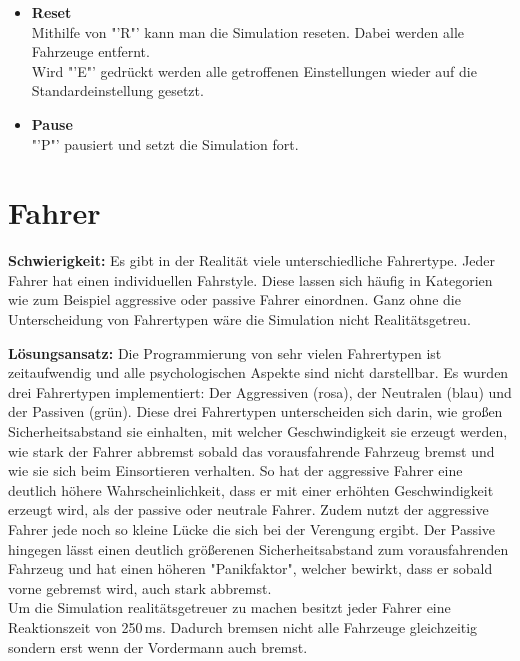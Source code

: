 \begin{addmargin}[25pt]{0pt}
\begin{itemize}
		\item \textbf{Reset}\\
		Mithilfe von "'R"' kann man die Simulation reseten. Dabei werden alle Fahrzeuge entfernt.\\
		Wird "'E"' gedrückt werden alle getroffenen Einstellungen wieder auf die Standardeinstellung gesetzt.
		\item \textbf{Pause}\\
		"'P"' pausiert und setzt die Simulation fort.
	\end{itemize}
\end{addmargin}

\section{Fahrer}
\textbf{Schwierigkeit:} Es gibt in der Realität viele unterschiedliche Fahrertype. Jeder Fahrer hat einen individuellen Fahrstyle. Diese lassen sich häufig in Kategorien wie zum Beispiel aggressive oder passive Fahrer einordnen. Ganz ohne die Unterscheidung von Fahrertypen wäre die Simulation nicht Realitätsgetreu.
\begin{addmargin}[25pt]{0pt}
	\item \textbf{Lösungsansatz:} Die Programmierung von sehr vielen Fahrertypen ist zeitaufwendig und alle psychologischen Aspekte sind nicht darstellbar. Es wurden drei Fahrertypen implementiert: Der Aggressiven (rosa), der Neutralen (blau) und der Passiven (grün). Diese drei Fahrertypen unterscheiden sich darin, wie großen Sicherheitsabstand sie einhalten, mit welcher Geschwindigkeit sie erzeugt werden, wie stark der Fahrer abbremst sobald das vorausfahrende Fahrzeug bremst und wie sie sich beim Einsortieren verhalten. So hat der aggressive Fahrer eine deutlich höhere Wahrscheinlichkeit, dass er mit einer erhöhten Geschwindigkeit erzeugt wird, als der passive oder neutrale Fahrer. Zudem nutzt der aggressive Fahrer jede noch so kleine Lücke die sich bei der Verengung ergibt. Der Passive hingegen lässt einen deutlich größerenen Sicherheitsabstand zum vorausfahrenden Fahrzeug und hat einen höheren "Panikfaktor", welcher bewirkt, dass er sobald vorne gebremst wird, auch stark abbremst.\\
Um die Simulation realitätsgetreuer zu machen besitzt jeder Fahrer eine Reaktionszeit von 250\,ms. Dadurch bremsen nicht alle Fahrzeuge gleichzeitig sondern erst wenn der Vordermann auch bremst.\\
\end{addmargin}